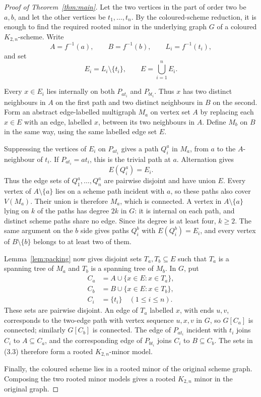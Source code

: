 \documentclass[11pt]{amsart}
\begin{document}
\begin{proof}[Proof of Theorem~\ref{thm:main}]
Let the two vertices in the part of order two be $a,b$, and let the other
vertices be $t_1,\ldots,t_n$.  By the coloured-scheme reduction, it is
enough to find the required rooted minor in the underlying graph $G$ of a
coloured $K_{2,n}$-scheme.  Write
\[
 A=f^{-1}(a),\qquad B=f^{-1}(b),\qquad L_i=f^{-1}(t_i),
\]
and set
\[
                  E_i=L_i\setminus\{t_i\},
                  \qquad E=\bigcup_{i=1}^n E_i.          \tag{3.1}
\]

Every $x\in E_i$ lies internally on both $P_{at_i}$ and $P_{bt_i}$.
Thus $x$ has two distinct neighbours in $A$ on the first path and two
distinct neighbours in $B$ on the second.  Form an abstract
edge-labelled multigraph $M_a$ on vertex set $A$ by replacing each
$x\in E$ with an edge, labelled $x$, between its two neighbours in $A$.
Define $M_b$ on $B$ in the same way, using the same labelled edge set
$E$.

Suppressing the vertices of $E_i$ on $P_{at_i}$ gives a path $Q_i^a$ in
$M_a$, from $a$ to the $A$-neighbour of $t_i$.  If $P_{at_i}=at_i$, this
is the trivial path at $a$.  Alternation gives
\[
                         E(Q_i^a)=E_i.                    \tag{3.2}
\]
Thus the edge sets of $Q_1^a,\ldots,Q_n^a$ are pairwise disjoint and have
union $E$.  Every vertex of $A\setminus\{a\}$ lies on a scheme path
incident with $a$, so these paths also cover $V(M_a)$.  Their union is
therefore $M_a$, which is connected.  A vertex in $A\setminus\{a\}$
lying on $k$ of the paths has degree $2k$ in $G$: it is internal on each
path, and distinct scheme paths share no edge.  Since its degree is at
least four, $k\geq2$.  The same argument on the $b$ side gives paths
$Q_i^b$ with $E(Q_i^b)=E_i$, and every vertex of $B\setminus\{b\}$
belongs to at least two of them.

Lemma~\ref{lem:packing} now gives disjoint sets $T_a,T_b\subseteq E$ such
that $T_a$ is a spanning tree of $M_a$ and $T_b$ is a spanning tree of
$M_b$.  In $G$, put
\[
 \begin{aligned}
 C_a&=A\cup\{x\in E:x\in T_a\},\\
 C_b&=B\cup\{x\in E:x\in T_b\},\\
 C_i&=\{t_i\} \quad (1\leq i\leq n).
 \end{aligned}                                            \tag{3.3}
\]
These sets are pairwise disjoint.  An edge of $T_a$ labelled $x$, with
ends $u,v$, corresponds to the two-edge path with vertex sequence $u,x,v$
in $G$, so $G[C_a]$ is connected; similarly $G[C_b]$ is connected.  The
edge of $P_{at_i}$ incident with $t_i$ joins $C_i$ to $A\subseteq C_a$,
and the corresponding edge of $P_{bt_i}$ joins $C_i$ to $B\subseteq C_b$.
The sets in (3.3) therefore form a rooted $K_{2,n}$-minor model.

Finally, the coloured scheme lies in a rooted minor of the original
scheme graph.  Composing the two rooted minor models gives a rooted
$K_{2,n}$ minor in the original graph.
\end{proof}
\end{document}
